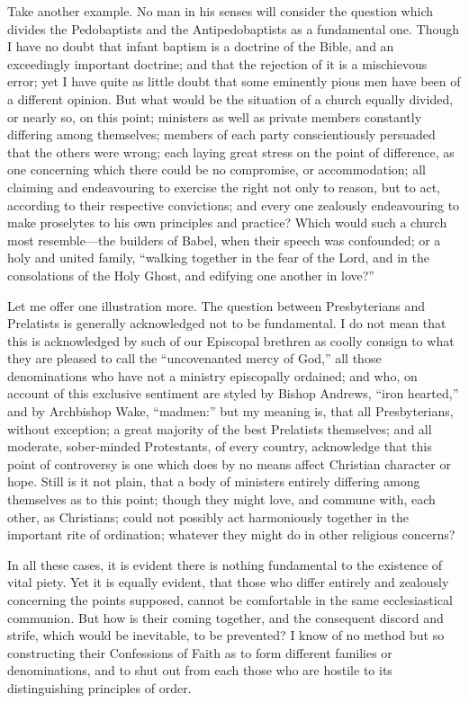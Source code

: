 \documentclass[
]{book}
\begin{document}
Take another example. No man in his senses will consider the question which divides the Pedobaptists and the Antipedobaptists as a fundamental one. Though I have no doubt that infant baptism is a doctrine of the Bible, and an exceedingly important doctrine; and that the rejection of it is a mischievous error; yet I have quite as little doubt that some eminently pious men have been of a different opinion. But what would be the situation of a church equally divided, or nearly so, on this point; ministers as well as private members constantly differing among themselves; members of each party conscientiously persuaded that the others were wrong; each laying great stress on the point of difference, as one concerning which there could be no compromise, or accommodation; all claiming and endeavouring to exercise the right not only to reason, but to act, according to their respective convictions; and every one zealously endeavouring to make proselytes to his own principles and practice? Which would such a church most resemble---the builders of Babel, when their speech was confounded; or a holy and united family, ``walking together in the fear of the Lord, and in the consolations of the Holy Ghost, and edifying one another in love?''

Let me offer one illustration more. The question between Presbyterians and Prelatists is generally acknowledged not to be fundamental. I do not mean that this is acknowledged by such of our Episcopal brethren as coolly consign to what they are pleased to call the ``uncovenanted mercy of God,'' all those denominations who have not a ministry episcopally ordained; and who, on account of this exclusive sentiment are styled by Bishop Andrews, ``iron hearted,'' and by Archbishop Wake, ``madmen:'' but my meaning is, that all Presbyterians, without exception; a great majority of the best Prelatists themselves; and all moderate, sober-minded Protestants, of every country, acknowledge that this point of controversy is one which does by no means affect Christian character or hope. Still is it not plain, that a body of ministers entirely differing among themselves as to this point; though they might love, and commune with, each other, as Christians; could not possibly act harmoniously together in the important rite of ordination; whatever they might do in other religious concerns?

In all these cases, it is evident there is nothing fundamental to the existence of vital piety. Yet it is equally evident, that those who differ entirely and zealously concerning the points supposed, cannot be comfortable in the same ecclesiastical communion. But how is their coming together, and the consequent discord and strife, which would be inevitable, to be prevented? I know of no method but so constructing their Confessions of Faith as to form different families or denominations, and to shut out from each those who are hostile to its distinguishing principles of order.
\end{document}
